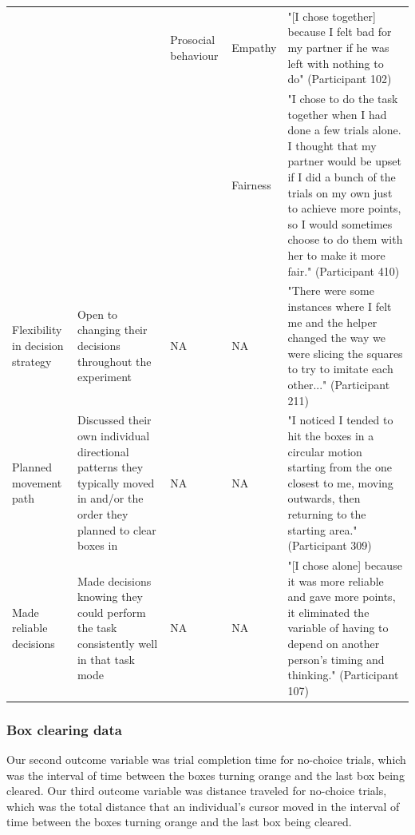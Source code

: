 \documentclass[
  man,
  floatsintext,
  longtable,
  nolmodern,
  notxfonts,
  notimes,
  mask,
  colorlinks=true,linkcolor=blue,citecolor=blue,urlcolor=blue]{apa7}
\begin{document}
\begin{landscape}
\begin{longtable*}[l]{>{\raggedright\arraybackslash}p{3cm}>{\raggedright\arraybackslash}p{6cm}>{\raggedright\arraybackslash}p{3cm}>{\raggedright\arraybackslash}p{2cm}>{\raggedright\arraybackslash}p{6cm}}
\addlinespace
 &  & Prosocial behaviour & Empathy & "[I chose together] because I felt bad for my partner if he was left with nothing to do" (Participant 102)\\
\addlinespace
 &  &  & Fairness & "I chose to do the task together when I had done a few trials alone. I thought that my partner would be upset if I did a bunch of the trials on my own just to achieve more points, so I would sometimes choose to do them with her to make it more fair." (Participant 410)\\
\addlinespace
Flexibility in decision strategy & Open to changing their decisions throughout the experiment & NA & NA & "There were some instances where I felt me and the helper changed the way we were slicing the squares to try to imitate each other..." (Participant 211)\\
\addlinespace
Planned movement path & Discussed their own individual directional patterns they typically moved in and/or the order they planned to clear boxes in & NA & NA & "I noticed I tended to hit the boxes in a circular motion starting from the one closest to me, moving outwards, then returning to the starting area." (Participant 309)\\
\addlinespace
Made reliable decisions & Made decisions knowing they could perform the task consistently well in that task mode & NA & NA & "[I chose alone] because it was more reliable and gave more points, it eliminated the variable of having to depend on another person's timing and thinking." (Participant 107)\\
\bottomrule
\end{longtable*}
\endgroup{}

\end{landscape}

\clearpage

\subsubsection{Box clearing data}\label{box-clearing-data}

Our second outcome variable was trial completion time for no-choice
trials, which was the interval of time between the boxes turning orange
and the last box being cleared. Our third outcome variable was distance
traveled for no-choice trials, which was the total distance that an
individual's cursor moved in the interval of time between the boxes
turning orange and the last box being cleared.
\end{document}
